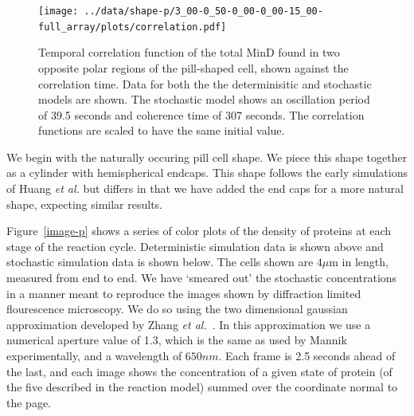 \documentclass{pnastwo}
\newcommand\micron{\ensuremath{\mu\text{m}}}
\begin{document}
\begin{article}
\begin{figure}
  \begin{center}
    \texttt{[image: ../data/shape-p/3\_00-0\_50-0\_00-0\_00-15\_00-full\_array/plots/correlation.pdf]}
  \end{center}
  \caption{Temporal correlation function of the total MinD found in
    two opposite polar regions of the pill-shaped cell, shown against
    the correlation time.  Data for both the the determinisitic and
    stochastic models are shown.  The stochastic model shows an
    oscillation period of 39.5 seconds and coherence time of 307 seconds.
    The correlation functions are scaled to have the same initial
    value.}
  \label{corr-pill}
\end{figure}

We begin with the naturally occuring pill cell shape.  We piece this
shape together as a cylinder with hemispherical endcaps.  This shape
follows the early simulations of Huang \emph{et al.} but differs in
that we have added the end caps for a more natural shape, expecting
similar results.

Figure~\ref{image-p} shows a series of color plots of the density of
proteins at each stage of the reaction cycle. Deterministic simulation
data is shown above and stochastic simulation data is shown below.
The cells shown are $4\micron$ in length, measured from end to end.
We have `smeared out' the stochastic concentrations in a manner meant
to reproduce the images shown by diffraction limited flourescence
microscopy.  We do so using the two dimensional gaussian approximation
developed by Zhang \emph{et al.}~\cite{zhang2007gaussian}.  In this
approximation we use a numerical aperture value of 1.3, which is the
same as used by Mannik experimentally, and a wavelength of $650nm$.
Each frame is 2.5 seconds ahead of the last, and each image shows the
concentration of a given state of protein (of the five described in
the reaction model) summed over the coordinate normal to the page.


\end{article}
\end{document}
